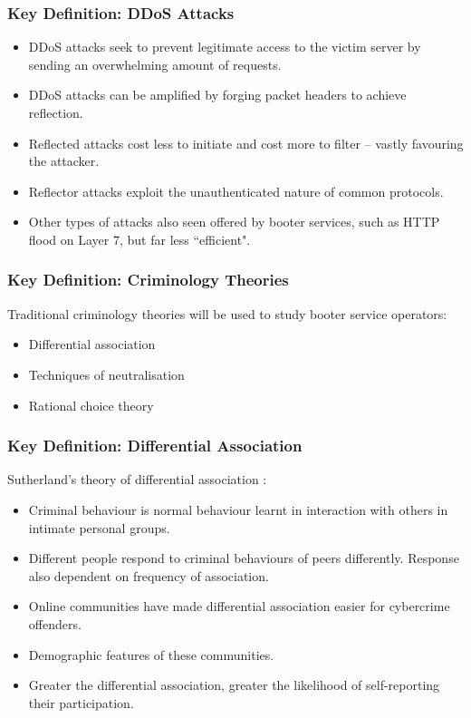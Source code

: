 \documentclass[aspectratio=1610]{beamer}
\begin{document}
\begin{frame}
\frametitle{Key Definition: DDoS Attacks}
\begin{itemize}
\setlength\itemsep{1em}
\item DDoS attacks seek to prevent legitimate access to the victim server by sending an overwhelming amount of requests.
\item DDoS attacks can be amplified by forging packet headers to achieve reflection.
\item Reflected attacks cost less to initiate and cost more to filter -- vastly favouring the attacker.
\item Reflector attacks exploit the unauthenticated nature of common protocols.
\item Other types of attacks also seen offered by booter services, such as HTTP flood on Layer 7, but far less ``efficient".
\end{itemize}
\end{frame}


\begin{frame}
\frametitle{Key Definition: Criminology Theories}
Traditional criminology theories will be used to study booter service operators: \par
\vspace{0.5em}
\begin{itemize}
\setlength\itemsep{1em}
\item Differential association
\item Techniques of neutralisation
\item Rational choice theory
\end{itemize}
\end{frame}

\begin{frame}
\frametitle{Key Definition: Differential Association}
Sutherland's theory of differential association \cite{sutherland1983white}: \par
\begin{itemize}
\setlength\itemsep{1em}
\item Criminal behaviour is normal behaviour learnt in interaction with others in intimate personal groups.
\item Different people respond to criminal behaviours of peers differently. Response also dependent on frequency of association.
\item Online communities have made differential association easier for cybercrime offenders.
\item Demographic features of these communities.
\item Greater the differential association, greater the likelihood of self-reporting their participation.
\end{itemize}
\end{frame}
\end{document}
